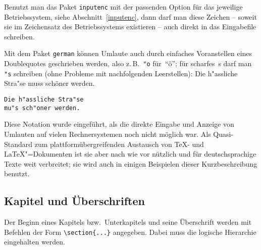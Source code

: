Benutzt man das Paket \texttt{inputenc} mit der passenden Option
für das jeweilige Betriebssystem, siehe Abschnitt~\ref{inputenc},
dann darf man diese Zeichen -- soweit sie im Zeichensatz des Betriebssystems
existieren -- auch direkt in das Eingabefile schreiben.

Mit dem Paket \texttt{german} %
können
Umlaute auch durch einfaches Voranstellen eines Doublequotes geschrieben werden, 
also z.\,B.\ \lstinline|"o| für~"`ö"';
für scharfes~s darf man \lstinline|"s| schreiben (ohne Probleme mit
nachfolgenden Leerstellen):
\exa
Die h"assliche Stra"se
muss schöner werden.
\exb
\begin{verbatim}
Die h"assliche Stra"se
mu"s sch"oner werden.
\end{verbatim}
\exc
Diese Notation wurde eingeführt, als die direkte Eingabe und
Anzeige von Umlauten auf vielen Rechnersystemen noch nicht möglich war.
Als Quasi-Standard zum plattformübergreifenden Austausch von 
\TeX- und \LaTeX"=Dokumenten ist sie aber nach wie vor nützlich und
für deutschsprachige Texte weit verbreitet; sie wird auch in einigen 
Beispielen dieser Kurzbeschreibung benutzt.
 


\subsection{Kapitel und Überschriften}
 
Der Beginn eines Kapitels bzw.\ Unterkapitels und seine
Überschrift werden mit Befehlen der Form \lstinline|\section{...}|
angegeben. Dabei muss die logische Hierarchie eingehalten werden.

